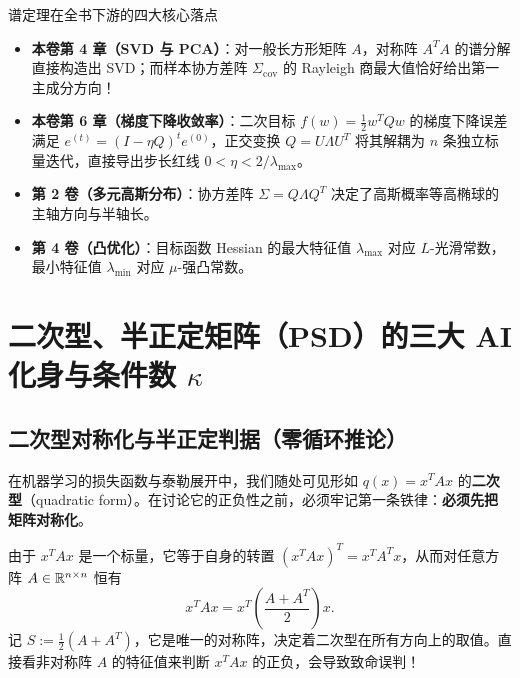 \begin{insightBox}{谱定理在全书下游的四大核心落点}
\begin{itemize}
  \item \textbf{本卷第 4 章（SVD 与 PCA）}：对一般长方形矩阵 $A$，对称阵 $A^T A$ 的谱分解直接构造出 SVD；而样本协方差阵 $\Sigma_{\mathrm{cov}}$ 的 Rayleigh 商最大值恰好给出第一主成分方向！
  \item \textbf{本卷第 6 章（梯度下降收敛率）}：二次目标 $f(w) = \frac{1}{2}w^T Q w$ 的梯度下降误差满足 $e^{(t)} = (I - \eta Q)^t e^{(0)}$，正交变换 $Q = U\Lambda U^T$ 将其解耦为 $n$ 条独立标量迭代，直接导出步长红线 $0 < \eta < 2/\lambda_{\max}$。
  \item \textbf{第 2 卷（多元高斯分布）}：协方差阵 $\Sigma = Q\Lambda Q^T$ 决定了高斯概率等高椭球的主轴方向与半轴长。
  \item \textbf{第 4 卷（凸优化）}：目标函数 Hessian 的最大特征值 $\lambda_{\max}$ 对应 $L$-光滑常数，最小特征值 $\lambda_{\min}$ 对应 $\mu$-强凸常数。
\end{itemize}
\end{insightBox}

\section{二次型、半正定矩阵（PSD）的三大 AI 化身与条件数 $\kappa$}
\label{sec:ch3-psd-cond}

\subsection{二次型对称化与半正定判据（零循环推论）}

在机器学习的损失函数与泰勒展开中，我们随处可见形如 $q(x) = x^T A x$ 的\textbf{二次型}（quadratic form）。在讨论它的正负性之前，必须牢记第一条铁律：\textbf{必须先把矩阵对称化}。

由于 $x^T A x$ 是一个标量，它等于自身的转置 $(x^T A x)^T = x^T A^T x$，从而对任意方阵 $A \in \mathbb{R}^{n\times n}$ 恒有
\[
  x^T A x = x^T \!\left(\frac{A + A^T}{2}\right) x.
\]
记 $S := \frac{1}{2}(A + A^T)$，它是唯一的对称阵，决定着二次型在所有方向上的取值。直接看非对称阵 $A$ 的特征值来判断 $x^T A x$ 的正负，会导致致命误判！

